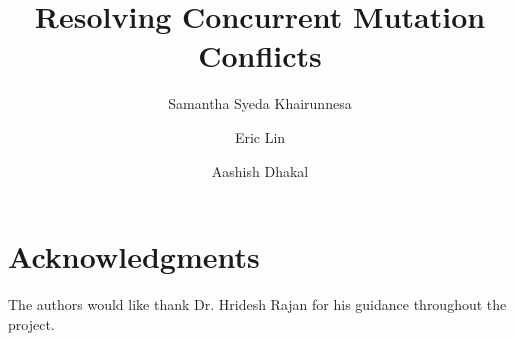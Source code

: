 \documentclass{llncs}
\begin{document}
\title{Resolving Concurrent Mutation Conflicts}

\author{Samantha Syeda Khairunnesa \and Eric Lin \and Aashish Dhakal}
%

\maketitle

\begin{abstract}

\end{abstract}

 
 
 
 
 

 


\section{Acknowledgments}

The authors would like thank Dr. Hridesh Rajan for his guidance throughout the project. 


  
\end{document}

